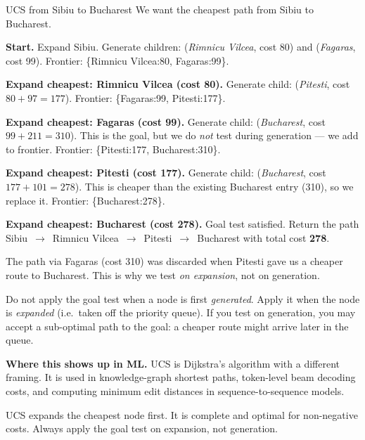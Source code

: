\documentclass[a4paper,11pt]{article}
\begin{document}
\begin{worked}{UCS from Sibiu to Bucharest}
We want the cheapest path from Sibiu to Bucharest.
\begin{steps}
  \item \textbf{Start.} Expand Sibiu. Generate children:
        (\textit{Rimnicu Vilcea}, cost 80) and (\textit{Fagaras}, cost 99).
        Frontier: \{Rimnicu Vilcea:80, Fagaras:99\}.
  \item \textbf{Expand cheapest: Rimnicu Vilcea (cost 80).}
        Generate child: (\textit{Pitesti}, cost $80+97=177$).
        Frontier: \{Fagaras:99, Pitesti:177\}.
  \item \textbf{Expand cheapest: Fagaras (cost 99).}
        Generate child: (\textit{Bucharest}, cost $99+211=310$). This is the
        goal, but we do \emph{not} test during generation --- we add to
        frontier.
        Frontier: \{Pitesti:177, Bucharest:310\}.
  \item \textbf{Expand cheapest: Pitesti (cost 177).}
        Generate child: (\textit{Bucharest}, cost $177+101=278$). This is
        cheaper than the existing Bucharest entry (310), so we replace it.
        Frontier: \{Bucharest:278\}.
  \item \textbf{Expand cheapest: Bucharest (cost 278).}
        Goal test satisfied. Return the path
        Sibiu~$\to$~Rimnicu Vilcea~$\to$~Pitesti~$\to$~Bucharest with total
        cost \textbf{278}.
\end{steps}
The path via Fagaras (cost 310) was discarded when Pitesti gave us a cheaper
route to Bucharest. This is why we test \emph{on expansion}, not on
generation.
\end{worked}

\begin{watchout}
Do not apply the goal test when a node is first \emph{generated}. Apply it
when the node is \emph{expanded} (i.e.\ taken off the priority queue). If you
test on generation, you may accept a sub-optimal path to the goal: a cheaper
route might arrive later in the queue.
\end{watchout}

\noindent\textbf{Where this shows up in ML.}
UCS is Dijkstra's algorithm with a different framing. It is used in
knowledge-graph shortest paths, token-level beam decoding costs, and computing
minimum edit distances in sequence-to-sequence models.

\begin{keytake}
UCS expands the cheapest node first. It is complete and optimal for
non-negative costs. Always apply the goal test on expansion, not generation.
\end{keytake}
\end{document}
